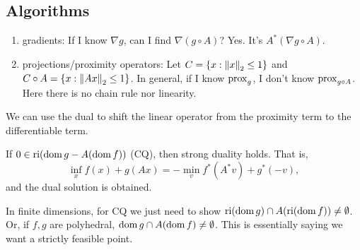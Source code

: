 \documentclass[class=article,crop=false]{standalone}
\begin{document}
\subsection{Algorithms}
\begin{enumerate}[label=(\arabic*)]
	\item gradients: If I know $ \nabla g$, can I find $ \nabla (g \circ A)$? Yes. It's $ A^* (\nabla g \circ A)$.
	\item projections/proximity operators: Let $ C = \{x: {\left\lVert{ x}\right\rVert}_2 \leq 1\} $ and $ C \circ A = \{x: {\left\lVert{ Ax}\right\rVert}_2 \leq 1\} $. In general, if I know $ \operatorname{prox}_{g}$, I don't know $ \operatorname{prox}_{g \circ A}$. Here there is no chain rule nor linearity.
\end{enumerate}
\begin{remark}
We can use the dual to shift the linear operator from the proximity term to the differentiable term.
\end{remark}

\begin{thm}
	If $ 0 \in \operatorname{ri} (\operatorname{dom} g - A(\operatorname{dom} f))$ (CQ), then strong duality holds. That is,
	\[
		\inf_x f(x) + g(Ax) = -\min_{v} f^* (A^* v) + g^* (-v)
	,\]
	and the dual solution is obtained.
\end{thm}
\begin{note}
	In finite dimensions, for CQ we just need to show $ \operatorname{ri}(\operatorname{dom} g) \cap A (\operatorname{ri} (\operatorname{dom} f))\neq \emptyset$. Or, if $ f,g$ are polyhedral,  $ \operatorname{dom} g \cap A(\operatorname{dom} f) \neq \emptyset$. This is essentially saying we want a strictly feasible point.
\end{note}
\end{document}
